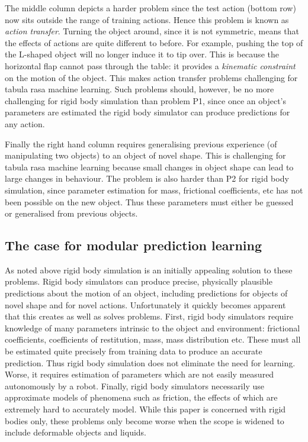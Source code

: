  The middle column depicts a harder problem since the test action (bottom row) now sits outside the range of training actions. Hence this problem is known as {\em action transfer}. Turning the object around, since it is not symmetric, means that the effects of actions are quite different to before. For example, pushing the top of the L-shaped object will no longer induce it to tip over. This is because the horizontal flap cannot pass through the table: it provides a {\em kinematic constraint} on the motion of the object. This makes action transfer problems challenging for tabula rasa machine learning. Such problems should, however, be no more challenging for rigid body simulation than problem P1, since once an object's parameters are estimated the rigid body simulator can produce predictions for any action.

 Finally the right hand column requires generalising previous experience (of manipulating two objects) to an object of novel shape. This is challenging for tabula rasa machine learning because small changes in object shape can lead to large changes in behaviour. The problem is also harder than P2 for rigid body simulation, since parameter estimation for mass, frictional coefficients, etc has not been possible on the new object. Thus these parameters must either be guessed or generalised from previous objects.

\subsection{The case for modular prediction learning}

As noted above rigid body simulation is an initially appealing solution to these problems. Rigid body simulators can produce precise, physically plausible predictions about the motion of an object, including predictions for objects of novel shape and for novel actions. Unfortunately it quickly becomes apparent that this creates as well as solves problems. First, rigid body simulators require knowledge of many parameters intrinsic to the object and environment: frictional coefficients, coefficients of restitution, mass, mass distribution etc. These must all be estimated quite precisely from training data to produce an accurate prediction. Thus rigid body simulation does not eliminate the need for learning. Worse, it requires estimation of parameters which are not easily measured autonomously by a robot. Finally, rigid body simulators necessarily use approximate models of phenomena such as friction, the effects of which are extremely hard to accurately model. While this paper is concerned with rigid bodies only, these problems only become worse when the scope is widened to include deformable objects and liquids.

